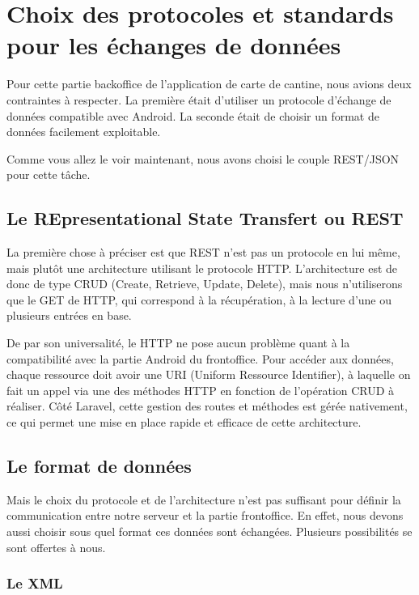 \chapter{Choix des protocoles et standards pour les échanges de données}

Pour cette partie backoffice de l'application de carte de cantine, nous avions
deux contraintes à respecter. La première était d'utiliser un protocole d'échange
 de données compatible avec Android. La seconde était de choisir un format de données
 facilement exploitable.

 Comme vous allez le voir maintenant, nous avons choisi le couple REST/JSON pour cette
 tâche.

\section{Le REpresentational State Transfert ou REST}

La première chose à préciser est que REST n'est pas un protocole en lui même, mais
plutôt une architecture utilisant le protocole HTTP. L'architecture est de donc de type
CRUD (Create, Retrieve, Update, Delete), mais nous n'utiliserons que le GET de HTTP,
qui correspond à la récupération, à la lecture d'une ou plusieurs entrées en base.

De par son universalité, le HTTP ne pose aucun problème quant à la compatibilité
avec la partie Android du frontoffice. Pour accéder aux données, chaque ressource doit
avoir une URI (Uniform Ressource Identifier), à laquelle on fait un appel via une
des méthodes HTTP en fonction de l'opération CRUD à réaliser. Côté Laravel, cette
gestion des routes et méthodes est gérée nativement, ce qui permet une mise en place
rapide et efficace de cette architecture.

\section{Le format de données}

Mais le choix du protocole et de l'architecture n'est pas suffisant pour définir
la communication entre notre serveur et la partie frontoffice. En effet, nous devons
aussi choisir sous quel format ces données sont échangées. Plusieurs possibilités
se sont offertes à nous.

\subsection{Le XML}

